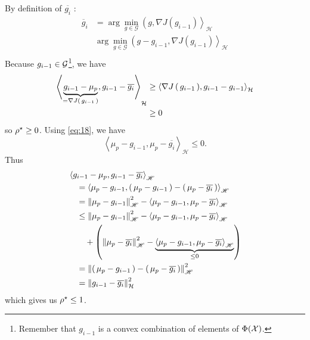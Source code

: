 By definition of $\overline{g_i}$ :
\begin{align*}
  \overline { g } _ { i } &= \arg \min _ { g \in \mathscr { G } } \left( g , \nabla J \left( g _ { i - 1 } \right) \right\rangle _ { \mathscr { H } }\\
  & \arg \min _ { g \in \mathscr { G } } \left( g - g _ { i - 1 } , \nabla J \left( g _ { i - 1 } \right) \right\rangle _ { \mathscr { H } }\\
\end{align*}
Because $g_{i-1} \in \mathcal{G}$\footnote{Remember that $g_{i-1}$ is a convex combination
of elements of $\Phi(\mathcal{X})$.}, we have
\begin{align*}
  \left\langle \underbrace{g _ { i - 1 } - \mu _ { p }}_{=\operatorname{\nabla\!}{J\left( \, g_{i-1} \, \right)}} , g _ { i - 1 } - \overline{g_i} \right\rangle _ { \mathcal { H } } &\geq
  \left\langle \operatorname{\nabla\!}{J\left( \, g_{i-1} \, \right)} , g _ { i - 1 } -  g _ { i - 1 }\right\rangle _ { \mathcal { H } }\\
  &\geq 0
\end{align*}
so $\ropt \geq 0$.
Using \eqref{eq:18}, we have
\begin{equation}
  \label{eq:neg}
  \left\langle \mu _ { p } - g _ { i -1} , \mu _ { p } - \overline { g _ { i } } \right\rangle _ { \mathscr { H } } \leq 0.
\end{equation}
Thus
\begin{align*}
  &\left\langle g _ { i - 1 } - \mu _ { p } , g _ { i - 1 } - \overline { g _ { i } } \right\rangle _ { \mathscr { H } } \\&\quad =
  \left\langle \mu_p-g_{i-1} , \left( \, \mu_p-g_{i-1} \, \right) - \left( \, \mu_p-\overline{g_i}  \, \right) \right\rangle_ { \mathscr { H } }\\
  &\quad =\left\| \mu_p-g_{i-1} \right\|_ { \mathscr { H } } ^ { 2 } - \left\langle \mu_p-g_{i-1} , \mu_p-\overline{g_i}  \right\rangle_ { \mathscr { H } }\\
  &\quad \leq \left\| \mu_p-g_{i-1} \right\|_ { \mathscr { H } } ^ { 2 } - \left\langle \mu_p-g_{i-1} , \mu_p-\overline{g_i}  \right\rangle_ { \mathscr { H } } \\&\qquad + \left( \left\| \mu_p-\overline{g_i}  \right\|_ { \mathscr { H } } ^ { 2 } - \underbrace{\left\langle \mu_p-g_{i-1} , \mu_p-\overline{g_i}  \right\rangle_ { \mathscr { H }} }_{\leq 0} \right)\\
  &\quad = \left\| \left( \, \mu_p-g_{i-1} \, \right) - \left( \, \mu_p-\overline{g_i}  \, \right) \right\|_ { \mathscr { H } } ^ { 2 }\\
  &\quad = \left\| g _ { i - 1 } - \overline{g_i} \right\| _ { \mathcal { H } } ^ { 2 }
\end{align*}
which gives us $\ropt \leq 1$.

